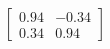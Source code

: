 \documentclass[preview]{standalone}
\begin{document}
\begin{align*}
\begin{bmatrix} 0.94 & -0.34 \\ 0.34 & 0.94 \end{bmatrix}
\end{align*}
\end{document}
